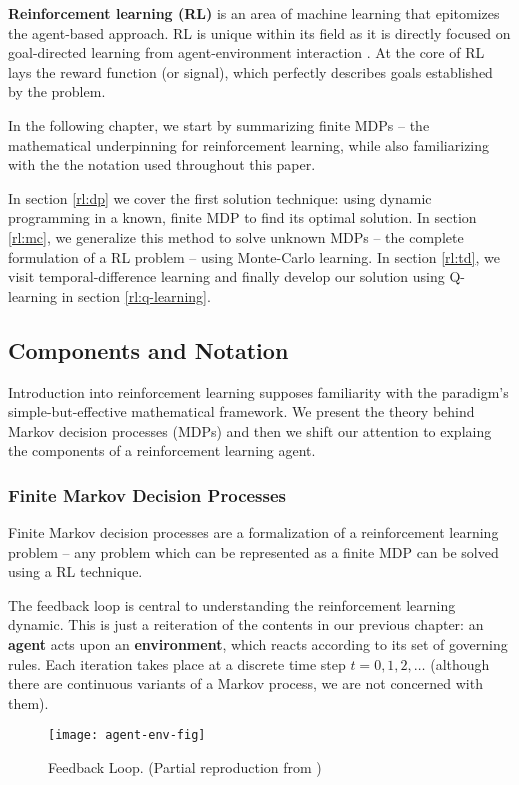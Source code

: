 \textbf{Reinforcement learning (RL)} is an area of machine learning that epitomizes the agent-based approach.
RL is unique within its field as it is directly focused on goal-directed learning from agent-environment interaction \cite{rlai}.
At the core of RL lays the reward function (or signal), which perfectly describes goals established by the problem.

In the following chapter, we start by summarizing finite MDPs -- the mathematical underpinning for reinforcement learning, while also familiarizing with the the notation used throughout this paper.

In section \ref{rl:dp} we cover the first solution technique: using dynamic programming in a known, finite MDP to find its optimal solution.
In section \ref{rl:mc}, we generalize this method to solve unknown MDPs -- the complete formulation of a RL problem -- using Monte-Carlo learning.
In section \ref{rl:td}, we visit temporal-difference learning and finally develop our solution using Q-learning in section \ref{rl:q-learning}.

\subsection{Components and Notation}
Introduction into reinforcement learning supposes familiarity with the paradigm's simple-but-effective mathematical framework.
We present the theory behind Markov decision processes (MDPs) and then we shift our attention to explaing the components of a reinforcement learning agent.

\subsubsection{Finite Markov Decision Processes}
Finite Markov decision processes are a formalization of a reinforcement learning problem -- any problem which can be represented as a finite MDP can be solved using a RL technique.

The feedback loop is central to understanding the reinforcement learning dynamic.
This is just a reiteration of the contents in our previous chapter:
an \textbf{agent} acts upon an \textbf{environment}, which reacts according to its set of governing rules.
Each iteration takes place at a discrete time step \(t = 0,1,2,\dots \) (although there are continuous variants of a Markov process, we are not concerned with them).

\begin{figure}[ht]
    \centering
    \caption{Feedback Loop. (Partial reproduction from \cite{rlai})}
    \vspace*{0.2cm}
    \texttt{[image: agent-env-fig]}
\end{figure}

